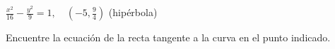 \setcounter{enumi}{24}
\item $\displaystyle \frac{x^2}{16} - \frac{y^2}{9} = 1, \quad \left(-5, \frac{9}{4}\right)$ \quad (hipérbola)
\par
Encuentre la ecuación de la recta tangente a la curva en el punto indicado.
